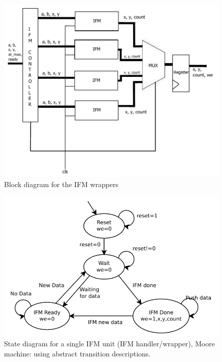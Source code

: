 \documentclass{article}
\begin{document}
\begin{figure}[h!]
  \centering
    \includegraphics[width=\textwidth]{block_diagrams/ifmunit.pdf}
  \caption{Block diagram for the IFM wrappers}
\end{figure}

\begin{figure}[h!]
  \centering
    \includegraphics[width=\textwidth]{state_diagrams/ifmunit.pdf}
  \caption{State diagram for a single IFM unit (IFM handler/wrapper),
    Moore machine: using abstract transition descriptions.}
\end{figure}
\end{document}
